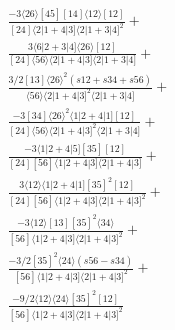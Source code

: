 \documentclass[varwidth, border=5pt]{standalone}
\begin{document}
\begin{my}
$\begin{gathered}
\scriptscriptstyle\frac{-3⟨26⟩[45][14]⟨12⟩[12]}{[24]⟨2|1+4|3]⟨2|1+3|4]^2}+\\
\scriptscriptstyle\frac{3⟨6|2+3|4]⟨26⟩[12]}{[24]⟨56⟩⟨2|1+4|3]⟨2|1+3|4]}+\\
\scriptscriptstyle\frac{3/2[13]⟨26⟩^2(s12+s34+s56)}{⟨56⟩⟨2|1+4|3]^2⟨2|1+3|4]}+\\
\scriptscriptstyle\frac{-3[34]⟨26⟩^2⟨1|2+4|1][12]}{[24]⟨56⟩⟨2|1+4|3]^2⟨2|1+3|4]}+\\
\scriptscriptstyle\frac{-3⟨1|2+4|5][35][12]}{[24][56]⟨1|2+4|3]⟨2|1+4|3]}+\\
\scriptscriptstyle\frac{3⟨12⟩⟨1|2+4|1][35]^2[12]}{[24][56]⟨1|2+4|3]⟨2|1+4|3]^2}+\\
\scriptscriptstyle\frac{-3⟨12⟩[13][35]^2⟨34⟩}{[56]⟨1|2+4|3]⟨2|1+4|3]^2}+\\
\scriptscriptstyle\frac{-3/2[35]^2⟨24⟩(s56-s34)}{[56]⟨1|2+4|3]⟨2|1+4|3]^2}+\\
\scriptscriptstyle\frac{-9/2⟨12⟩⟨24⟩[35]^2[12]}{[56]⟨1|2+4|3]⟨2|1+4|3]^2}\phantom{+}
\end{gathered}$
\end{my}
\end{document}
